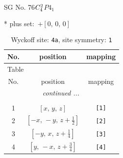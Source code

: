 \documentclass[fleqn,8pt]{jsarticle}
\begin{document}
\setcounter{MaxMatrixCols}{32}

\renewcommand{\tablename}{Table~}
\renewcommand{\figurename}{Figure~}
\begin{center}
\LARGE
SG No. 76\quad$C_{\rm 4}^{2}$\quad$P4_1$\quad[ tetragonal ]
\end{center}
* plus set:\,\,\,$+\left[ 0,\, 0,\, 0 \right]$
\renewcommand{\arraystretch}{1.2}
\begin{longtable}{ccc}
\caption{Wyckoff site: {\tt 4a}, site symmetry: {\tt 1}}
 \\
 \hline \hline
No. & position & mapping \\ \hline \endfirsthead

\multicolumn{2}{l}{\tablename\ \thetable{}} \\
 \hline \hline
No. & position & mapping \\ \hline \endhead

 \hline \hline
\multicolumn{2}{r}{\footnotesize\it continued ...} \\ \endfoot

 \hline \hline
\multicolumn{2}{r}{} \\ \endlastfoot

1 & $\left[ x,\, y,\, z \right]$ & {\tt [1]} \\ \hline
2 & $\left[ - x,\, - y,\, z + \frac{1}{2} \right]$ & {\tt [2]} \\ \hline
3 & $\left[ - y,\, x,\, z + \frac{1}{4} \right]$ & {\tt [3]} \\ \hline
4 & $\left[ y,\, - x,\, z + \frac{3}{4} \right]$ & {\tt [4]} \\
\end{longtable}
\end{document}

